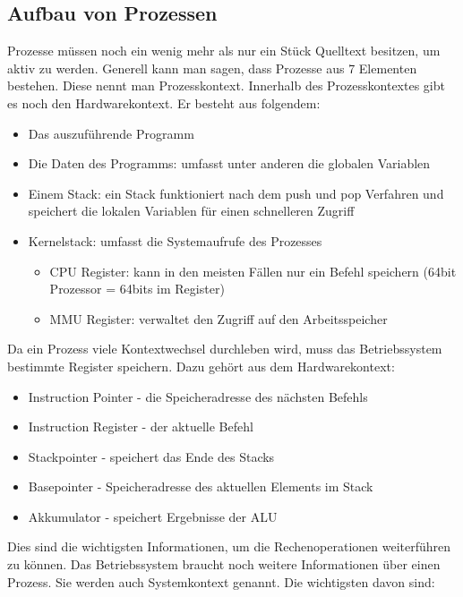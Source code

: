 \subsection{Aufbau von Prozessen}

Prozesse müssen noch ein wenig mehr als nur ein Stück Quelltext besitzen, um aktiv zu werden. Generell kann man sagen, dass Prozesse aus 7 Elementen bestehen.
Diese nennt man Prozesskontext. Innerhalb des Prozesskontextes gibt es noch den Hardwarekontext. Er besteht aus folgendem:
\begin{itemize}
    \setlength\itemsep{0pt}
    \item Das auszuführende Programm
    \item Die Daten des Programms: umfasst unter anderen die globalen Variablen
    \item Einem Stack: ein Stack funktioniert nach dem push und pop Verfahren und speichert die lokalen Variablen für einen schnelleren Zugriff
    \item Kernelstack: umfasst die Systemaufrufe des Prozesses
          \begin{itemize}
              \item CPU Register: kann in den meisten Fällen nur ein Befehl speichern (64bit Prozessor = 64bits im Register)
              \item MMU Register: verwaltet den Zugriff auf den Arbeitsspeicher
          \end{itemize}
\end{itemize}

Da ein Prozess viele Kontextwechsel durchleben wird, muss das Betriebssystem bestimmte Register speichern. Dazu gehört aus dem Hardwarekontext:

\begin{itemize}
    \setlength\itemsep{0pt}
    \item Instruction Pointer - die Speicheradresse des nächsten Befehls
    \item Instruction Register - der aktuelle Befehl
    \item Stackpointer - speichert das Ende des Stacks
    \item Basepointer - Speicheradresse des aktuellen Elements im Stack
    \item Akkumulator - speichert Ergebnisse der ALU
\end{itemize}

Dies sind die wichtigsten Informationen, um die Rechenoperationen weiterführen zu können. Das Betriebssystem braucht noch weitere Informationen über einen Prozess. Sie werden auch Systemkontext genannt. Die wichtigsten davon sind:

